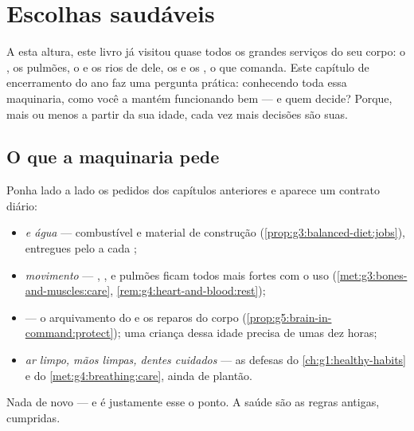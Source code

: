 \chapter{Escolhas saudáveis}\label{ch:g5:healthy-choices}

A esta altura, este livro já visitou quase todos os grandes serviços
do seu corpo: o , os pulmões, o  e os rios de
 dele, os  e os , o  que comanda. Este
capítulo de encerramento do ano faz uma pergunta prática: conhecendo
toda essa maquinaria, como você a mantém funcionando bem --- e quem
decide? Porque, mais ou menos a partir da sua idade, cada vez mais
decisões são suas.

\section{O que a maquinaria pede}

\begin{proposition}\label{prop:g5:healthy-choices:contract}
Ponha lado a lado os pedidos dos capítulos anteriores e aparece um
contrato diário:
\begin{itemize}
  \item \emph{ e água} --- combustível e material de
        construção (\cref{prop:g3:balanced-diet:jobs}), entregues
        pelo  a cada ;
  \item \emph{movimento} --- , ,  e pulmões
        ficam todos mais fortes com o uso
        (\cref{met:g3:bones-and-muscles:care},
        \cref{rem:g4:heart-and-blood:rest});
  \item \emph{} --- o arquivamento do  e os reparos do
        corpo (\cref{prop:g5:brain-in-command:protect}); uma criança
        dessa idade precisa de umas dez horas;
  \item \emph{ar limpo, mãos limpas, dentes cuidados} --- as defesas
        do \cref{ch:g1:healthy-habits} e do
        \cref{met:g4:breathing:care}, ainda de plantão.
\end{itemize}
Nada de novo --- e é justamente esse o ponto. A saúde são as regras
antigas, cumpridas.
\end{proposition}
\admitted

